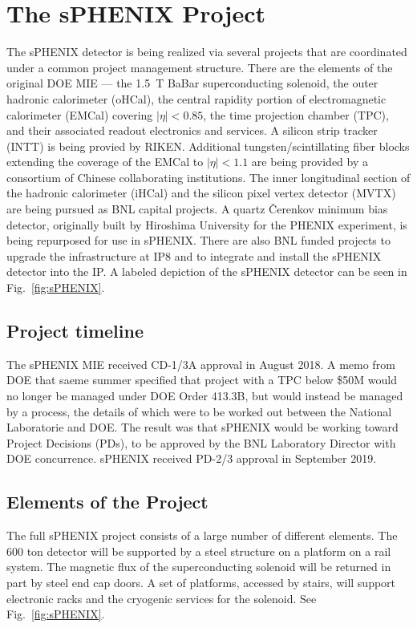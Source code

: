 \chapter{The sPHENIX Project}
\label{chap:project}

The sPHENIX detector is being realized via several projects that are
coordinated under a common project management structure.  There are
the elements of the original DOE MIE --- the 1.5~T BaBar
superconducting solenoid, the outer hadronic calorimeter (oHCal), the
central rapidity portion of electromagnetic calorimeter (EMCal)
covering $|\eta| < 0.85$, the time projection chamber (TPC), and their
associated readout electronics and services.  A silicon strip tracker
(INTT) is being provied by RIKEN.  Additional tungsten/scintillating
fiber blocks extending the coverage of the EMCal to $|\eta| < 1.1$ are
being provided by a consortium of Chinese collaborating institutions.
The inner longitudinal section of the hadronic calorimeter (iHCal) and
the silicon pixel vertex detector (MVTX) are being pursued as BNL
capital projects.  A quartz \v{C}erenkov minimum bias detector,
originally built by Hiroshima University for the PHENIX experiment, is
being repurposed for use in sPHENIX.  There are also BNL funded
projects to upgrade the infrastructure at IP8 and to integrate and
install the sPHENIX detector into the IP.  A labeled depiction of the
sPHENIX detector can be seen in Fig.~\ref{fig:sPHENIX}.

\section{Project timeline}
\label{sec:timeline}

The sPHENIX MIE received CD-1/3A approval in August 2018.  A memo from
DOE that saeme summer specified that project with a TPC below \$50M
would no longer be managed under DOE Order 413.3B, but would instead
be managed by a process, the details of which were to be worked out
between the National Laboratorie and DOE.  The result was that sPHENIX
would be working toward Project Decisions (PDs), to be approved by the
BNL Laboratory Director with DOE concurrence.  sPHENIX received PD-2/3
approval in September 2019.

\section{Elements of the Project}
\label{sec:elements}

The full sPHENIX project consists of a large number of different
elements.  The 600 ton detector will be supported by a steel structure
on a platform on a rail system.  The magnetic flux of the
superconducting solenoid will be returned in part by steel end cap
doors.  A set of platforms, accessed by stairs, will support
electronic racks and the cryogenic services for the solenoid.  See
Fig.~\ref{fig:sPHENIX}.

